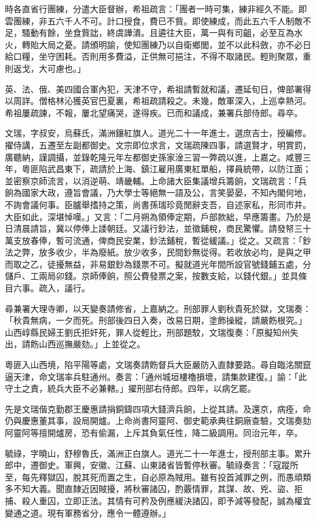 \begin{pinyinscope}
時各直省行團練，分遣大臣督辦，希祖疏言：「團者一時可集，練非經久不能。即雲團練，非五六千人不可。計口授食，費已不貲。即使練成，而此五六千人制敵不足，騷動有餘，坐食貲詘，終虞譁潰。且遴往大臣，萬一與有司齟，必至互為水火，轉貽大局之憂。請頒明諭，使知團練乃以自衛鄉閭，並不以此科斂，亦不必日給口糧，坐守困耗。否則用多費溢，正供無可挹注，不得不取諸民。輕則聚眾，重則返戈，大可慮也。」

英、法、俄、美四國合軍內犯，天津不守，希祖請暫就和議，遷延旬日，俾部署得以周詳。僧格林沁獲英官巴夏裏，希祖疏請殺之。未幾，敵軍深入，上巡幸熱河。希祖屢疏諫，不報，屢北望痛哭，遂得疾。已而和議成，兼署兵部侍郎。尋卒。

文瑞，字叔安，烏蘇氏，滿洲鑲紅旗人。道光二十一年進士，選庶吉士，授編修。擢侍講，五遷至左副都御史。文宗即位求言，文瑞疏陳四事，請選賢才，明賞罰，廣聽納，謹調攝，並錄乾隆元年左都御史孫家淦三習一弊疏以進，上嘉之。咸豐三年，粵匪陷武昌東下，疏請於上海、鎮江雇用廣東紅單船，擇員統帶，以防江面；並密察京師流言，以消逆萌、靖畿輔。上命諸大臣集議增兵籌餉，文瑞疏言：「兵餉為國家大政，遵旨會議，乃大學士等絕無一語及公，言笑晏晏，不知內閣何地，不詢會議何事。臣臚舉搘持之策，尚書孫瑞珍竟閒辭支吾，自述家私，形同市井。大臣如此，深堪悼嘆。」又言：「二月朔為領俸定期，戶部款絀，早應籌畫。乃於是日清晨請旨，冀以停俸上諉朝廷。又議行鈔法，並徵鋪稅，商民驚懼。請發帑三十萬支放春俸，暫可流通，俾商民安業，鈔法鋪稅，暫從緩議。」從之。又疏言：「鈔法之弊，放多收少，半為廢紙。放少收多，民間鈔無從得。若收放必均，是與之甲而取之乙，徒擾無益，非易銀鈔為錢票不可。擬就道光年間所設官號錢鋪五處，分儲戶、工兩局卯錢。京師俸餉，照公費發票之案，按數支給，以錢代銀。」並具條目六事。疏入，議行。

尋兼署大理寺卿，以天變奏請修省，上嘉納之。刑部罪人劉秋貴死於獄，文瑞奏：「秋貴無病，一夕而死。刑部後四日入奏，改易日期，塗飾操縱，請嚴飭根究。」山西崞縣民婦王劉氏拒奸死，罪人從輕比，刑部題駮，文瑞復奏：「原擬知州失出，請飭山西巡撫嚴劾。」上並從之。

粵匪入山西境，陷平陽等處，文瑞奏請飭督兵大臣嚴防入直隸要路。尋自臨洺關竄逼天津，命文瑞率兵駐通州。奏言：「通州城垣樓櫓損壞，請集款建復。」諭：「此守土之責，統兵大臣不必兼轄。」擢刑部右侍郎。四年，以病乞罷。

先是文瑞偕克勤郡王慶惠請捐銅鑄四項大錢濟兵餉，上從其請。及還京，病痊，命仍與慶惠董其事，設局開爐。上命尚書阿靈阿、御史範承典往銅廠查驗，文瑞奏劾阿靈阿等擅開爐房，恐有偷漏，上斥其負氣任性，降二級調用。同治元年，卒。

毓祿，字曉山，舒穆魯氏，滿洲正白旗人。道光二十一年進士，授刑部主事。累升郎中，遷御史。軍興，安徽、江蘇、山東諸省皆暫停秋審。毓祿奏言：「寇蹤所至，每先釋獄囚，脫其死而置之生，自必原為賊用。雖有投首減罪之例，而愚頑類多不知大義。聞直隸近因賊擾，將秋審諸囚，酌覈情罪，其謀、故、兇、盜、拒捕、殺人重囚，立即正法。其情有可矜及例應緩決諸囚，即予減等發配，誠為權宜變通之道。現有軍務省分，應令一體遵辦。」


\end{pinyinscope}
